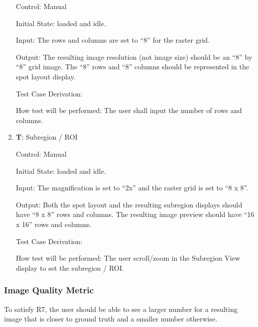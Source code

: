 \documentclass[12pt, titlepage]{article}
\newcounter{testnum} %
\begin{document}
\begin{enumerate}
    Control: Manual
                
    Initial State: \progname{} loaded and idle.
              
    Input: The rows and columns are set to ``8'' for the raster grid.
              
    Output: The resulting image resolution (not image size) should be an ``8'' by ``8'' grid image.
    The ``8'' rows and ``8'' columns should be represented in the spot layout display.

    Test Case Derivation: 

    How test will be performed: The user shall input the number of rows and columns.

    \item{\textbf{T\thetestnum \label{T_subregion}}: Subregion / ROI\\}

    Control: Manual
                
    Initial State: \progname{} loaded and idle.
              
    Input: The magnification is set to ``2x'' and the raster grid is set to ``8 x 8''.
              
    Output: Both the spot layout and the resulting subregion displays should have ``8 x 8'' rows and columns. The resulting image preview should have ``16 x 16'' rows and columns.

    Test Case Derivation: 

    How test will be performed: The user scroll/zoom in the Subregion View display to set the subregion / ROI.

\end{enumerate}


\subsubsection{Image Quality Metric} \label{subsec_img_metric}

To satisfy R7, the user should be able to see a larger number for a resulting image that is closer to ground truth 
and a smaller number otherwise.
\end{document}
